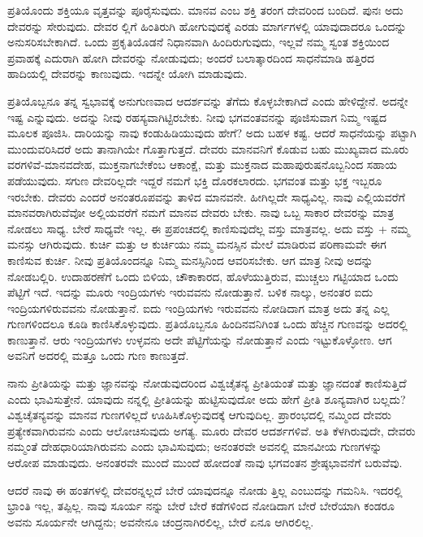 ಪ್ರತಿಯೊಂದು ಶಕ್ತಿಯೂ ವೃತ್ತವನ್ನು ಪೂರೈಸುವುದು. ಮಾನವ ಎಂಬ ಶಕ್ತಿ ತರಂಗ ದೇವರಿಂದ ಬಂದಿದೆ. ಪುನಃ ಅದು ದೇವರನ್ನು ಸೇರುವುದು. ದೇವರ ಲ್ಲಿಗೆ ಹಿಂತಿರುಗಿ ಹೋಗುವುದಕ್ಕೆ ಎರಡು ಮಾರ್ಗಗಳಲ್ಲಿ ಯಾವುದಾದರೂ ಒಂದನ್ನು ಅನುಸರಿಸಬೇಕಾಗಿದೆ. ಒಂದು ಪ್ರಕೃತಿಯೊಡನೆ ನಿಧಾನವಾಗಿ ಹಿಂದಿರುಗುವುದು, ಇಲ್ಲವೆ ನಮ್ಮ ಸ್ವಂತ ಶಕ್ತಿಯಿಂದ ಪ್ರವಾಹಕ್ಕೆ ಎದುರಾಗಿ ಹೋಗಿ ದೇವರನ್ನು ನೋಡುವುದು; ಅಂದರೆ ಬಲಾತ್ಕಾರದಿಂದ ಸಾಧನೆಮಾಡಿ ಹತ್ತಿರದ ಹಾದಿಯಲ್ಲಿ ದೇವರನ್ನು ಕಾಣುವುದು. ಇದನ್ನೇ ಯೋಗಿ ಮಾಡುವುದು.

ಪ್ರತಿಯೊಬ್ಬನೂ ತನ್ನ ಸ್ವಭಾವಕ್ಕೆ ಅನುಗುಣವಾದ ಆದರ್ಶವನ್ನು ತೆಗೆದು ಕೊಳ್ಳಬೇಕಾಗಿದೆ ಎಂದು ಹೇಳಿದ್ದೇನೆ. ಅದನ್ನೇ ಇಷ್ಟ ಎನ್ನುವುದು. ಅದನ್ನು ನೀವು ರಹಸ್ಯವಾಗಿಟ್ಟಿರಬೇಕು. ನೀವು ಭಗವಂತವನನ್ನು ಪೂಜಿಸುವಾಗ ನಿಮ್ಮ ಇಷ್ಟದ ಮೂಲಕ ಪೂಜಿಸಿ. ದಾರಿಯನ್ನು ನಾವು ಕಂಡುಹಿಡಿಯುವುದು ಹೇಗೆ? ಅದು ಬಹಳ ಕಷ್ಟ. ಆದರೆ ಸಾಧನೆಯನ್ನು ಪಟ್ಟಾಗಿ ಮುಂದುವರಿಸಿದರೆ ಅದು ತಾನಾಗಿಯೇ ಗೊತ್ತಾಗುತ್ತದೆ. ದೇವರು ಮಾನವನಿಗೆ ಕೊಡುವ ಬಹು ಮುಖ್ಯವಾದ ಮೂರು ವರಗಳಿವೆ-ಮಾನವದೇಹ, ಮುಕ್ತನಾಗಬೇಕೆಂಬ ಆಕಾಂಕ್ಷೆ, ಮತ್ತು ಮುಕ್ತನಾದ ಮಹಾಪುರುಷನೊಬ್ಬನಿಂದ ಸಹಾಯ ಪಡೆಯುವುದು. ಸಗುಣ ದೇವರಿಲ್ಲದೇ ಇದ್ದರೆ ನಮಗೆ ಭಕ್ತಿ ದೊರಕಲಾರದು. ಭಗವಂತ ಮತ್ತು ಭಕ್ತ ಇಬ್ಬರೂ ಇರಬೇಕು. ದೇವರು ಎಂದರೆ ಅನಂತರೂಪವನ್ನು ತಾಳಿದ ಮಾನವನೇ. ಹೀಗಿಲ್ಲದೇ ಸಾಧ್ಯವಿಲ್ಲ. ನಾವು ಎಲ್ಲಿಯವರೆಗೆ ಮಾನವರಾಗಿರುವೆವೋ ಅಲ್ಲಿಯವರೆಗೆ ನಮಗೆ ಮಾನವ ದೇವರು ಬೇಕು. ನಾವು ಒಬ್ಬ ಸಾಕಾರ ದೇವರನ್ನು ಮಾತ್ರ ನೋಡಲು ಸಾಧ್ಯ. ಬೇರೆ ಸಾಧ್ಯವೇ ಇಲ್ಲ. ಈ ಪ್ರಪಂಚದಲ್ಲಿ ಕಾಣಿಸುವುದೆಲ್ಲ ವಸ್ತು ಮಾತ್ರವಲ್ಲ. ಅದು ವಸ್ತು + ನಮ್ಮ ಮನಸ್ಸು ಆಗಿರುವುದು. ಕುರ್ಚಿ ಮತ್ತು ಆ ಕುರ್ಚಿಯು ನಮ್ಮ ಮನಸ್ಸಿನ ಮೇಲೆ ಮಾಡಿರುವ ಪರಿಣಾಮವೇ ಈಗ ಕಾಣಿಸುವ ಕುರ್ಚಿ. ನೀವು ಪ್ರತಿಯೊಂದನ್ನೂ ನಿಮ್ಮ ಮನಸ್ಸಿನಿಂದ ಆವರಿಸಬೇಕು. ಆಗ ಮಾತ್ರ ನೀವು ಅದನ್ನು ನೋಡಬಲ್ಲಿರಿ. ಉದಾಹರಣೆಗೆ ಒಂದು ಬಿಳಿಯ, ಚೌಕಾಕಾರದ, ಹೊಳೆಯುತ್ತಿರುವ, ಮುಚ್ಚಲು ಗಟ್ಟಿಯಾದ ಒಂದು ಪೆಟ್ಟಿಗೆ ಇದೆ. ಇದನ್ನು ಮೂರು ಇಂದ್ರಿಯಗಳು ಇರುವವನು ನೋಡುತ್ತಾನೆ. ಬಳಿಕ ನಾಲ್ಕು, ಅನಂತರ ಐದು ಇಂದ್ರಿಯಗಳಿರುವವನು ನೋಡುತ್ತಾನೆ. ಐದು ಇಂದ್ರಿಯಗಳು ಇರುವವನು ನೋಡಿದಾಗ ಮಾತ್ರ ಅದು ತನ್ನ ಎಲ್ಲ ಗುಣಗಳಿಂದಲೂ ಕೂಡಿ ಕಾಣಿಸಿಕೊಳ್ಳುವುದು. ಪ್ರತಿಯೊಬ್ಬನೂ ಹಿಂದಿನವನಿಗಿಂತ ಒಂದು ಹೆಚ್ಚಿನ ಗುಣವನ್ನು ಅದರಲ್ಲಿ ಕಾಣುತ್ತಾನೆ. ಆರು ಇಂದ್ರಿಯಗಳು ಉಳ್ಳವನು ಅದೇ ಪೆಟ್ಟಿಗೆಯನ್ನು ನೋಡುತ್ತಾನೆ ಎಂದು ಇಟ್ಟುಕೊಳ್ಳೋಣ. ಆಗ ಅವನಿಗೆ ಅದರಲ್ಲಿ ಮತ್ತೂ ಒಂದು ಗುಣ ಕಾಣುತ್ತದೆ.

ನಾನು ಪ್ರೀತಿಯನ್ನು ಮತ್ತು ಜ್ಞಾನವನ್ನು ನೋಡುವುದರಿಂದ ವಿಶ್ವಚೈತನ್ಯ ಪ್ರೀತಿಯಂತೆ ಮತ್ತು ಜ್ಞಾನದಂತೆ ಕಾಣಿಸುತ್ತಿದೆ ಎಂದು ಭಾವಿಸುತ್ತೇನೆ. ಯಾವುದು ನನ್ನಲ್ಲಿ ಪ್ರೀತಿಯನ್ನು ಹುಟ್ಟಿಸುವುದೋ ಅದು ಹೇಗೆ ಪ್ರೀತಿ ಶೂನ್ಯವಾಗಿರ ಬಲ್ಲದು? ವಿಶ್ವಚೈತನ್ಯವನ್ನು ಮಾನವ ಗುಣಗಳಿಲ್ಲದೆ ಊಹಿಸಿಕೊಳ್ಳುವುದಕ್ಕೆ ಆಗುವುದಿಲ್ಲ. ಪ್ರಾರಂಭದಲ್ಲಿ ನಮ್ಮಿಂದ ದೇವರು ಪ್ರತ್ಯೇಕವಾಗಿರುವನು ಎಂದು ಆಲೋಚಿಸುವುದು ಅಗತ್ಯ. ಮೂರು ದೇವರ ಆದರ್ಶಗಳಿವೆ. ಅತಿ ಕೆಳಗಿರುವುದೇ, ದೇವರು ನಮ್ಮಂತೆ ದೇಹಧಾರಿಯಾಗಿರುವನು ಎಂದು ಭಾವಿಸುವುದು; ಅನಂತರವೇ ಅವನಲ್ಲಿ ಮಾನವೀಯ ಗುಣಗಳನ್ನು ಆರೋಪ ಮಾಡುವುದು. ಅನಂತರವೇ ಮುಂದೆ ಮುಂದೆ ಹೋದಂತೆ ನಾವು ಭಗವಂತನ ಶ್ರೇಷ್ಠಭಾವನೆಗೆ ಬರುವೆವು.

ಆದರೆ ನಾವು ಈ ಹಂತಗಳಲ್ಲಿ ದೇವರನ್ನಲ್ಲದೆ ಬೇರೆ ಯಾವುದನ್ನೂ ನೋಡು ತ್ತಿಲ್ಲ ಎಂಬುದನ್ನು ಗಮನಿಸಿ. ಇದರಲ್ಲಿ ಭ್ರಾಂತಿ ಇಲ್ಲ, ತಪ್ಪಿಲ್ಲ. ನಾವು ಸೂರ್ಯ ನನ್ನು ಬೇರೆ ಬೇರೆ ಕಡೆಗಳಿಂದ ನೋಡಿದಾಗ ಬೇರೆ ಬೇರೆಯಾಗಿ ಕಂಡರೂ ಅವನು ಸೂರ್ಯನೇ ಆಗಿದ್ದನು; ಅವನೇನೂ ಚಂದ್ರನಾಗಿರಲಿಲ್ಲ, ಬೇರೆ ಏನೂ ಆಗಿರಲಿಲ್ಲ.

